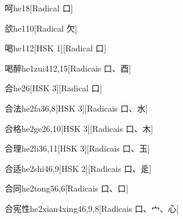 \begin{entry}{呵}{he1}{8}[Radical ⼝]
\end{entry}

\begin{entry}{欱}{he1}{10}[Radical ⽋]
\end{entry}

\begin{entry}{喝}{he1}{12}[HSK 1][Radical ⼝]
\end{entry}

\begin{entry}{喝醉}{he1zui4}{12,15}[Radicais ⼝、⾣]
\end{entry}

\begin{entry}{合}{he2}{6}[HSK 3][Radical ⼝]
\end{entry}

\begin{entry}{合法}{he2fa3}{6,8}[HSK 3][Radicais ⼝、⽔]
\end{entry}

\begin{entry}{合格}{he2ge2}{6,10}[HSK 3][Radicais ⼝、⽊]
\end{entry}

\begin{entry}{合理}{he2li3}{6,11}[HSK 3][Radicais ⼝、⽟]
\end{entry}

\begin{entry}{合适}{he2shi4}{6,9}[HSK 2][Radicais ⼝、⾡]
\end{entry}

\begin{entry}{合同}{he2tong5}{6,6}[Radicais ⼝、⼝]
\end{entry}

\begin{entry}{合宪性}{he2xian4xing4}{6,9,8}[Radicais ⼝、⼧、⼼]
\end{entry}

